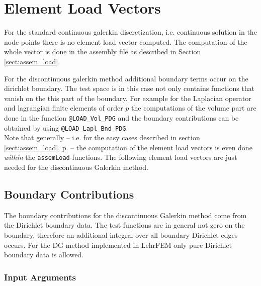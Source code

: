 
\section{Element Load Vectors} \label{sect:load} 

For the standard continuous galerkin discretization, i.e. continuous solution in the node points there is no element load vector computed. The computation of the whole vector is done in the assembly file as described in Section \ref{sect:assem_load}.

For the discontinuous galerkin method additional boundary terms occur on the dirichlet boundary. The test space is in this case not only contains functions that vanish on the this part of the boundary. For example for the Laplacian operator and lagrangian finite elements of order $p$ the computations of the volume part are done in the function {\tt @LOAD\_Vol\_PDG} and the boundary contributions can be obtained by using {\tt @LOAD\_Lapl\_Bnd\_PDG}.\\

Note that generally -- i.e. for the easy cases described in section \ref{sect:assem_load}, p. \pageref{sect:assem_load} -- the computation of the element load vectors is even done \emph{within} the {\tt assemLoad}-functions. The following element load vectors are just needed for the discontinuous Galerkin method.



\subsection{Boundary Contributions} 

The boundary contributions for the discontinuous Galerkin method come from the Dirichlet boundary data. The test functions are in general not zero on the boundary, therefore an additional integral over all boundary Dirichlet edges occurs. For the DG method implemented in LehrFEM only pure Dirichlet boundary data is allowed.

\subsubsection{Input Arguments} \label{sssect:load_bnd_in}

